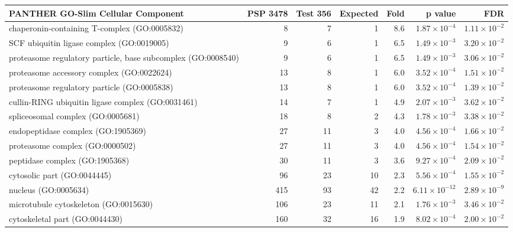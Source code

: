 

\begin{table}[ht]
\centering
\begin{adjustbox}{width=\textwidth}
\begin{tabular}{lrrrrrr}
  \hline
PANTHER GO-Slim Cellular Component & PSP 3478 & Test 356 & Expected & Fold & p value & FDR \\ 
  \hline
chaperonin-containing T-complex (GO:0005832) & 8 & 7 & 1 & 8.6 & $1.87 \times 10^{-4}$ & $1.11 \times 10^{-2}$ \\ 
  SCF ubiquitin ligase complex (GO:0019005) & 9 & 6 & 1 & 6.5 & $1.49 \times 10^{-3}$ & $3.20 \times 10^{-2}$ \\ 
  proteasome regulatory particle, base subcomplex (GO:0008540) & 9 & 6 & 1 & 6.5 & $1.49 \times 10^{-3}$ & $3.06 \times 10^{-2}$ \\ 
  proteasome accessory complex (GO:0022624) & 13 & 8 & 1 & 6.0 & $3.52 \times 10^{-4}$ & $1.51 \times 10^{-2}$ \\ 
  proteasome regulatory particle (GO:0005838) & 13 & 8 & 1 & 6.0 & $3.52 \times 10^{-4}$ & $1.39 \times 10^{-2}$ \\ 
  cullin-RING ubiquitin ligase complex (GO:0031461) & 14 & 7 & 1 & 4.9 & $2.07 \times 10^{-3}$ & $3.62 \times 10^{-2}$ \\ 
  spliceosomal complex (GO:0005681) & 18 & 8 & 2 & 4.3 & $1.78 \times 10^{-3}$ & $3.38 \times 10^{-2}$ \\ 
  endopeptidase complex (GO:1905369) & 27 & 11 & 3 & 4.0 & $4.56 \times 10^{-4}$ & $1.66 \times 10^{-2}$ \\ 
  proteasome complex (GO:0000502) & 27 & 11 & 3 & 4.0 & $4.56 \times 10^{-4}$ & $1.54 \times 10^{-2}$ \\ 
  peptidase complex (GO:1905368) & 30 & 11 & 3 & 3.6 & $9.27 \times 10^{-4}$ & $2.09 \times 10^{-2}$ \\ 
  cytosolic part (GO:0044445) & 96 & 23 & 10 & 2.3 & $5.56 \times 10^{-4}$ & $1.55 \times 10^{-2}$ \\ 
  nucleus (GO:0005634) & 415 & 93 & 42 & 2.2 & $6.11 \times 10^{-12}$ & $2.89 \times 10^{-9}$ \\ 
  microtubule cytoskeleton (GO:0015630) & 106 & 23 & 11 & 2.1 & $1.76 \times 10^{-3}$ & $3.46 \times 10^{-2}$ \\ 
  cytoskeletal part (GO:0044430) & 160 & 32 & 16 & 1.9 & $8.02 \times 10^{-4}$ & $2.00 \times 10^{-2}$ \\ 

\end{tabular}
\end{adjustbox}
\end{table}
